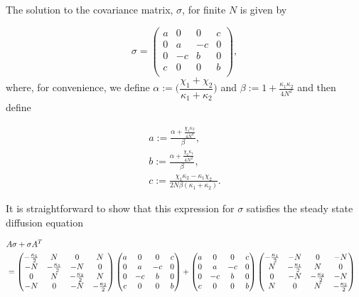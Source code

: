 \documentclass[11pt,a4paper]{article}
\numberwithin{equation}{section}
\begin{document}
	
	The solution to the covariance matrix, $\sigma$, for finite $N$ is given by 
	
	\begin{equation} \label{eq:44}
	\sigma = \begin{pmatrix}
	a & 0 & 0 & c\\
	0 & a & -c & 0\\
	0 & -c & b & 0 \\
	c & 0 & 0 & b\\
	\end{pmatrix},
	\end{equation}	
	where, for convenience, we define $\alpha := \Big(\dfrac{\chi_1 + \chi_2}{\kappa_1 + \kappa_2}\Big)$ and $\beta := 1 + \frac{\kappa_1 \kappa_2}{4N^2}$ and then define
	
	
	\begin{align*}
	&a := \frac{\alpha + \frac{\chi_1 \kappa_2}{4N^2}}{\beta},&\\
	&b := \frac{\alpha + \frac{\chi_2 \kappa_1}{4N^2}}{\beta},&\\
	&c := \frac{\chi_1 \kappa_2 - \kappa_1 \chi_2}{2N\beta (\kappa_1+\kappa_2)}.&		
	\end{align*}


	It is straightforward to show that this expression for $\sigma$ satisfies the steady state diffusion equation

	\begin{align*}
	\setlength\arraycolsep{3pt}
	&A\sigma +\sigma A^{T}&\\
	&= \begin{pmatrix}
	-\frac{\kappa_1}{2} & N & 0 & N\\
	-N & -\frac{\kappa_1}{2} & -N & 0 \\
	0 & N & -\frac{\kappa_2}{2} & N\\
	-N & 0 & -N & -\frac{\kappa_2}{2}\\
	\end{pmatrix}\begin{pmatrix}
	a & 0 & 0 & c\\
	0 & a & -c & 0\\
	0 & -c & b & 0 \\
	c & 0 & 0 & b\\
	\end{pmatrix} + \begin{pmatrix}
	a & 0 & 0 & c\\
	0 & a & -c & 0\\
	0 & -c & b & 0 \\
	c & 0 & 0 & b\\
	\end{pmatrix}\begin{pmatrix}
	-\frac{\kappa_1}{2} & -N & 0 & -N\\
	N & -\frac{\kappa_1}{2} & N & 0 \\
	0 & -N & -\frac{\kappa_2}{2} & -N\\
	N & 0 & N & -\frac{\kappa_2}{2}\\
	\end{pmatrix}
	\end{align*}
	
\end{document}
